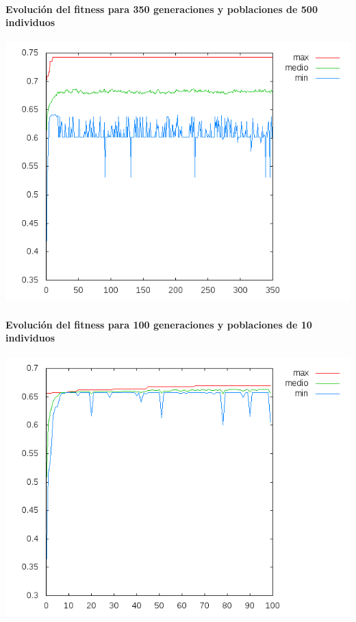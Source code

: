 \documentclass[nochap]{apuntes}
\begin{document}
\paragraph{Evolución del fitness para 350 generaciones y poblaciones de 500 individuos}
\begin{center}
\includegraphics[scale=0.6]{tex/img/g350_p500_ReemplazoTotal_SeleccionProporcionalAlFitness_reg11.png}
\end{center}

\paragraph{Evolución del fitness para 100 generaciones y poblaciones de 10 individuos}
\begin{center}
\includegraphics[scale=0.6]{tex/img/g100_p10_ReemplazoTotal_SeleccionProporcionalAlFitness_reg11.png}
\end{center}
\end{document}
